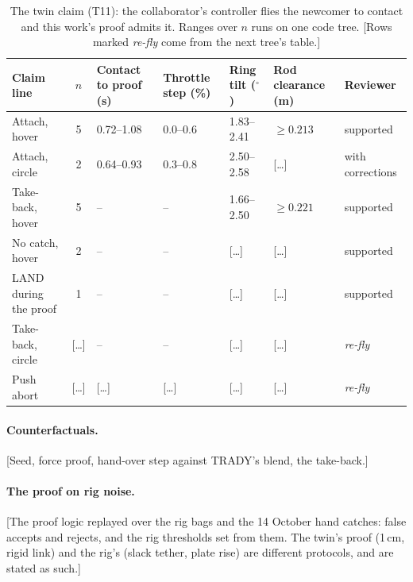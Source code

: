 \begin{table}[htbp]
  \centering
  \footnotesize
  \caption{The twin claim (T11): the collaborator's controller flies the newcomer to contact and this work's proof
  admits it. Ranges over $n$ runs on one code tree. [Rows marked \emph{re-fly} come from the next tree's table.]}
  \label{tab:T11}
  \begin{tabularx}{\textwidth}{XcYYYYl}
    \toprule
    Claim line & $n$ & Contact to proof (s) & Throttle step (\%) & Ring tilt ($^\circ$) & Rod clearance (m)
      & Reviewer \\
    \midrule
    Attach, hover & 5 & 0.72--1.08 & 0.0--0.6 & 1.83--2.41 & $\ge 0.213$ & supported \\
    Attach, circle & 2 & 0.64--0.93 & 0.3--0.8 & 2.50--2.58 & [\dots] & with corrections \\
    Take-back, hover & 5 & -- & -- & 1.66--2.50 & $\ge 0.221$ & supported \\
    No catch, hover & 2 & -- & -- & [\dots] & [\dots] & supported \\
    LAND during the proof & 1 & -- & -- & [\dots] & [\dots] & supported \\
    Take-back, circle & [\dots] & -- & -- & [\dots] & [\dots] & \emph{re-fly} \\
    Push abort & [\dots] & [\dots] & [\dots] & [\dots] & [\dots] & \emph{re-fly} \\
    \bottomrule
  \end{tabularx}
\end{table}

\paragraph{Counterfactuals.} [Seed, force proof, hand-over step against TRADY's blend, the take-back.]

\paragraph{The proof on rig noise.} [The proof logic replayed over the rig bags and the 14 October hand catches:
false accepts and rejects, and the rig thresholds set from them. The twin's proof (1\,cm, rigid link) and the rig's
(slack tether, plate rise) are different protocols, and are stated as such.]

